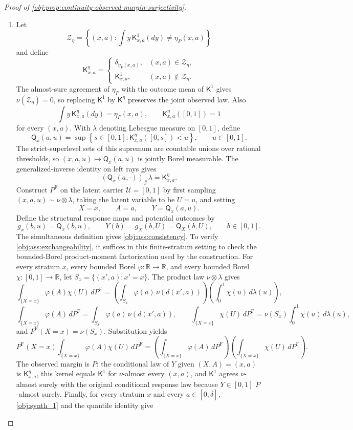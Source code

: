 \documentclass[11pt]{article}
\begin{document}
\begin{proof}[Proof of \cref{obj:prop:continuity-observed-margin-surjectivity}]
\begin{enumerate}
\item Let
\[
\mathcal Z_\eta=
\left\{(x,a):\int y\,\mathsf K^1_{x,a}(dy)\ne \eta_P(x,a)\right\}
\]
and define
\[
\mathsf K^\eta_{x,a}
=
\begin{cases}
\delta_{\eta_P(x,a)}, & (x,a)\in\mathcal Z_\eta,\\
\mathsf K^1_{x,a}, & (x,a)\notin\mathcal Z_\eta .
\end{cases}
\]
The almost-sure agreement of \(\eta_P\) with the outcome mean of \(\mathsf K^1\) gives \(\nu(\mathcal Z_\eta)=0\), so replacing \(\mathsf K^1\) by \(\mathsf K^\eta\) preserves the joint observed law.  Also
\[
\int y\,\mathsf K^\eta_{x,a}(dy)=\eta_P(x,a),
\qquad
\mathsf K^\eta_{x,a}([0,1])=1
\]
for every \((x,a)\).  With \(\lambda\) denoting Lebesgue measure on \([0,1]\), define
\[
\mathsf Q_x(a,u)
=
\sup\left\{s\in[0,1]:\mathsf K^\eta_{x,a}([0,s])<u\right\},
\qquad u\in[0,1].
\]
The strict-superlevel sets of this supremum are countable unions over rational thresholds, so \((x,a,u)\mapsto\mathsf Q_x(a,u)\) is jointly Borel measurable.  The generalized-inverse identity on left rays gives
\[
(\mathsf Q_x(a,\cdot))_{\#}\lambda=\mathsf K^\eta_{x,a}.
\]
Construct \(P^{\mathrm F}\) on the latent carrier \(\mathcal U=[0,1]\) by first sampling \((x,a,u)\sim\nu\otimes\lambda\), taking the latent variable to be \(U=u\), and setting
\[
X=x,\qquad A=a,\qquad Y=\mathsf Q_x(a,u).
\]
Define the structural response maps and potential outcomes by
\[
g_x(b,u)=\mathsf Q_x(b,u),\qquad
Y(b)=g_X(b,U)=\mathsf Q_X(b,U),\qquad b\in[0,1].
\]
The simultaneous definition gives \cref{obj:ass:consistency}.  To verify \cref{obj:ass:exchangeability}, it suffices in this finite-stratum setting to check the bounded-Borel product-moment factorization used by the construction.  For every stratum \(x\), every bounded Borel \(\varphi:\mathbb R\to\mathbb R\), and every bounded Borel \(\chi:[0,1]\to\mathbb R\), let \(S_x=\{(x',a):x'=x\}\).  The product law \(\nu\otimes\lambda\) gives
\[
\int_{\{X=x\}} \varphi(A)\chi(U)\,dP^{\mathrm F}
=
\left(\int_{S_x}\varphi(a)\,\nu(d(x',a))\right)
\left(\int_0^1\chi(u)\,d\lambda(u)\right),
\]
\[
\int_{\{X=x\}} \varphi(A)\,dP^{\mathrm F}
=
\int_{S_x}\varphi(a)\,\nu(d(x',a)),
\qquad
\int_{\{X=x\}} \chi(U)\,dP^{\mathrm F}=\nu(S_x)\int_0^1\chi(u)\,d\lambda(u),
\]
and \(P^{\mathrm F}(X=x)=\nu(S_x)\).  Substitution yields
\[
P^{\mathrm F}(X=x)
\int_{\{X=x\}} \varphi(A)\chi(U)\,dP^{\mathrm F}
=
\left(\int_{\{X=x\}} \varphi(A)\,dP^{\mathrm F}\right)
\left(\int_{\{X=x\}} \chi(U)\,dP^{\mathrm F}\right).
\]
The observed margin is \(P\): the conditional law of \(Y\) given \((X,A)=(x,a)\) is \(\mathsf K^\eta_{x,a}\), this kernel equals \(\mathsf K^1\) for \(\nu\)-almost every \((x,a)\), and \(\mathsf K^1\) agrees \(\nu\)-almost surely with the original conditional response law because \(Y\in[0,1]\) \(P\)-almost surely.  Finally, for every stratum \(x\) and every \(a\in[0,\bar\delta]\), \cref{obj:synth_1} and the quantile identity give

\end{enumerate}
\end{proof}
\end{document}
